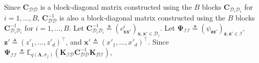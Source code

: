 \documentclass[conference]{IEEEtran}
\begin{document}
%	
\noindent
	Since $\mathbf{C}_\mathcal{DD}$ is a block-diagonal matrix constructed using the $B$ blocks $\mathbf{C}_{\mathcal{D}_i\mathcal{D}_i}$ for $i=1,\ldots,B$,
	$\mathbf{C}^{-1}_\mathcal{DD}$ is also a block-diagonal matrix constructed using the $B$ blocks $\mathbf{C}^{-1}_{\mathcal{D}_i\mathcal{D}_i}$ for $i=1,\ldots,B$.
	Let $\mathbf{C}^{-1}_{\mathcal{D}_i\mathcal{D}_i}\triangleq (c^{i}_{\mathbf{x}\mathbf{x}'})_{\mathbf{x},\mathbf{x}'\in\mathcal{D}_i}$.
%	
	Let $\mathbf{\Psi}_\mathcal{II}\triangleq (\psi_{\mathbf{z}\mathbf{z}'})_{\mathbf{z},\mathbf{z}'\in\mathcal{I}}$, $\mathbf{z}'\triangleq (z'_1,\ldots,z'_d)^\top$, and $\mathbf{x}'\triangleq (x'_1,\ldots,x'_d)^\top$.
	Since $\mathbf{\Psi}_\mathcal{II}\triangleq\mathbb{E}_{q(\mathbf{\Lambda},\sigma_f)}(\mathbf{K}_{\mathcal{ID}}\mathbf{C}^{-1}_\mathcal{DD}\mathbf{K}_{\mathcal{DI}})$,
	\vspace{-4mm}
\end{document}
